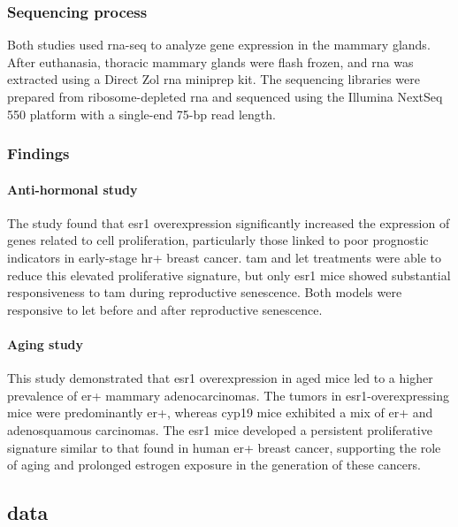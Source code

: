 \subsubsection{Sequencing process} \label{sec:dataset_sequencing}
Both studies used \gls{rna-seq} to analyze gene expression in the mammary
glands.
After euthanasia, thoracic mammary glands were flash frozen, and \gls{rna} was
extracted using a Direct Zol \gls{rna} miniprep kit.
The sequencing libraries were prepared from ribosome-depleted \gls{rna} and
sequenced using the Illumina NextSeq 550 platform with a single-end 75-bp read
length\supercite{furth_esr1_2023,furth_overexpression_2023}.

\subsubsection{Findings}

\paragraph{Anti-hormonal study}
The study found that \gls{esr1} overexpression significantly increased the
expression of genes related to cell proliferation, particularly those linked to
poor prognostic indicators in early-stage \gls{hr+} breast cancer.
\Gls{tam} and \gls{let} treatments were able to reduce this elevated
proliferative signature, but only \gls{esr1} mice showed substantial
responsiveness to \gls{tam} during reproductive senescence.
Both models were responsive to \gls{let} before and after reproductive
senescence\supercite{furth_esr1_2023}.

\paragraph{Aging study}
This study demonstrated that \gls{esr1} overexpression in aged mice led to a
higher prevalence of \gls{er+} mammary adenocarcinomas.
The tumors in \gls{esr1}-overexpressing mice were predominantly \gls{er+},
whereas \gls{cyp19} mice exhibited a mix of \gls{er+} and adenosquamous
carcinomas.
The \gls{esr1} mice developed a persistent proliferative signature similar to
that found in human \gls{er+} breast cancer, supporting the role of aging and
prolonged estrogen exposure in the generation of these
cancers\supercite{furth_overexpression_2023}.

\subsection{ data}
\label{sec:mirna_data}


